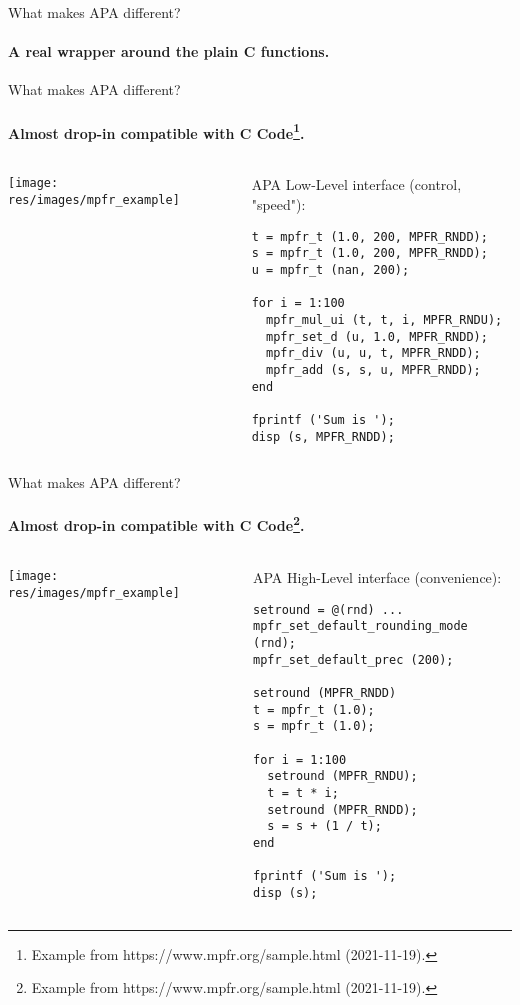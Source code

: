 \begin{frame}{What makes APA different?}
\framesubtitle{A real wrapper around the plain C functions.}


\end{frame}


\begin{frame}[fragile]{What makes APA different?}
\framesubtitle{Almost drop-in compatible with C Code\footnote{Example
from https://www.mpfr.org/sample.html (2021-11-19).}.}

\begin{columns}
\begin{column}[T]{0.3\textwidth}
\texttt{[image: res/images/mpfr\_example]}
\end{column}
\begin{column}[T]{0.5\textwidth}
APA {\color{blue}Low-Level} interface (control, "speed"): \\[1em]

\begin{lstlisting}[basicstyle=\tiny]
t = mpfr_t (1.0, 200, MPFR_RNDD);
s = mpfr_t (1.0, 200, MPFR_RNDD);
u = mpfr_t (nan, 200);

for i = 1:100
  mpfr_mul_ui (t, t, i, MPFR_RNDU);
  mpfr_set_d (u, 1.0, MPFR_RNDD);
  mpfr_div (u, u, t, MPFR_RNDD);
  mpfr_add (s, s, u, MPFR_RNDD);
end

fprintf ('Sum is ');
disp (s, MPFR_RNDD);
\end{lstlisting}
\end{column}
\end{columns}

\end{frame}


\begin{frame}[fragile]{What makes APA different?}
\framesubtitle{Almost drop-in compatible with C Code\footnote{Example
from https://www.mpfr.org/sample.html (2021-11-19).}.}

\begin{columns}
\begin{column}[T]{0.3\textwidth}
\texttt{[image: res/images/mpfr\_example]}
\end{column}
\begin{column}[T]{0.5\textwidth}
APA {\color{blue}High-Level} interface (convenience): \\[1em]

\begin{lstlisting}[basicstyle=\tiny]
% Setup default values
setround = @(rnd) ...
mpfr_set_default_rounding_mode (rnd);
mpfr_set_default_prec (200);

setround (MPFR_RNDD)
t = mpfr_t (1.0);
s = mpfr_t (1.0);

for i = 1:100
  setround (MPFR_RNDU);
  t = t * i;
  setround (MPFR_RNDD);
  s = s + (1 / t);
end

fprintf ('Sum is ');
disp (s);
\end{lstlisting}
\end{column}
\end{columns}

\end{frame}
